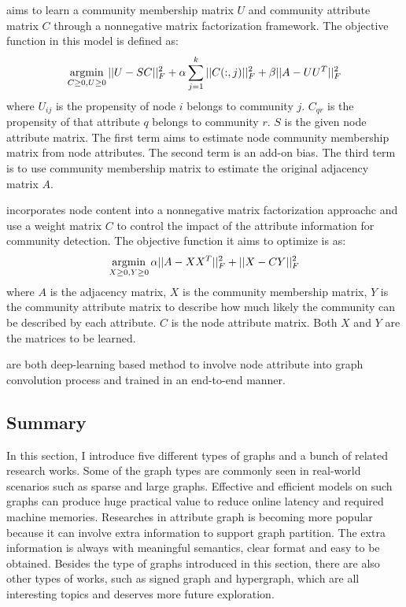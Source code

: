 \cite{wang2016semantic} aims to learn a community membership matrix $U$ and community attribute matrix $C$ through a nonnegative matrix factorization framework. The objective function in this model is defined as:
\begin{equation}
	\operatorname*{argmin}_{C \geq 0, U \geq 0}||U-SC||^2_F + \alpha\sum_{j=1}^{k}||C(:,j)||^2_F + \beta ||A-UU^T||^2_F
\end{equation}
where $U_{ij}$ is the propensity of node $i$ belongs to community $j$. $C_{qr}$ is the propensity of that attribute $q$ belongs to community $r$. $S$ is the given node attribute matrix. The first term aims to estimate node community membership matrix from node attributes. The second term is an add-on bias. The third term is to use community membership matrix to estimate the original adjacency matrix $A$.

\cite{qin2018adaptive} incorporates node content into a nonnegative matrix factorization approachc and use a weight matrix $C$ to control the impact of the attribute information for community detection. The objective function it aims to optimize is as:
\begin{equation}
\operatorname*{argmin}_{X \geq 0,Y \geq 0} \alpha ||A-XX^T||^2_F + ||X-CY||^2_F
\end{equation}
where $A$ is the adjacency matrix, $X$ is the community membership matrix, $Y$ is the community attribute matrix to describe how much likely the community can be described by each attribute. $C$ is the node attribute matrix. Both $X$ and $Y$ are the matrices to be learned. 

\cite{zhang2019attributed,jin2019graph} are both deep-learning based method to involve node attribute into graph convolution process and trained in an end-to-end manner.

\subsection{Summary}
In this section, I introduce five different types of graphs and a bunch of related research works. Some of the graph types are commonly seen in real-world scenarios such as sparse and large graphs. Effective and efficient models on such graphs can produce huge practical value to reduce online latency and required machine memories. Researches in attribute graph is becoming more popular because it can involve extra information to support graph partition. The extra information is always with meaningful semantics, clear format and easy to be obtained.  Besides the type of graphs introduced in this section, there are also other types of works, such as signed graph and hypergraph, which are all interesting topics and deserves more future exploration.  